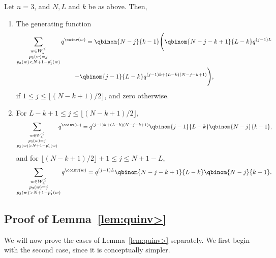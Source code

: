 \begin{lemma}
\label{lem:quinv<}
Let $n=3$, and $N, L$ and $k$ be as above. Then, 
\begin{enumerate}[label=(\arabic*)]
\item \label{it4vvt1}
The generating function
\begin{multline}
\label{quinv<l}
\sum_{\substack{ w \in W_k^\leq \\ p_3(w) = j \\ p_3(w) < N+1 - p'_1(w)}} q^{\coinv(w)} 
= \qbinom{N-j}{k-1} \Bigg( \qbinom {N-j-k+1}{L-k} q^{(j-1)L} \\
  - \qbinom{j-1}{L-k} q^{(j-1)k + (L-k)(N-j-k+1)} \Bigg),
\end{multline}
if $1 \leq j \leq \lfloor (N-k+1)/2 \rfloor$, and zero otherwise.

\item \label{it4vvt2}
For $L-k+1 \leq j \leq \lfloor (N-k+1)/2 \rfloor$,
\begin{equation}
\label{quinv<r1}
\sum_{\substack{ w \in W_k^\leq \\ p_3(w) = j \\ p_3(w) > N+1 - p'_1(w)}} q^{\coinv(w)} = q^{(j-1)k + (L-k)(N-j-k+1)}
\qbinom{j-1}{L-k} \qbinom{N-j}{k-1},
\end{equation}
and for $\lfloor (N-k+1)/2 \rfloor + 1 \leq j \leq N +1 - L$,
\begin{equation}
\label{quinv<r2}
\sum_{\substack{ w \in W_k^\leq \\ p_3(w) = j \\ p_3(w) > N+1 - p'_1(w)}} q^{\coinv(w)} = q^{ (j-1) L} 
\qbinom{N-j-k+1}{L-k} \qbinom {N-j}{k-1}.
\end{equation}
\end{enumerate}
\end{lemma}



\subsection{Proof of Lemma~\ref{lem:quinv>}}
We will now prove the cases of Lemma~\ref{lem:quinv>} separately.
We first begin with the second case, since it is conceptually simpler.

